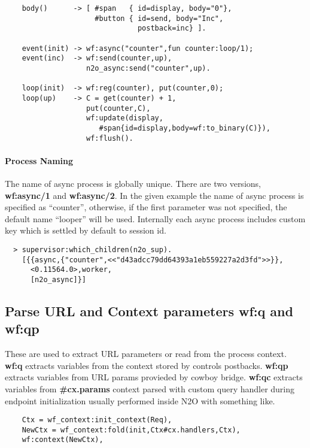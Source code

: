 \vspace{1\baselineskip}
\begin{lstlisting}
    body()      -> [ #span   { id=display, body="0"},
                     #button { id=send, body="Inc",
                               postback=inc} ].

    event(init) -> wf:async("counter",fun counter:loop/1);
    event(inc)  -> wf:send(counter,up),
                   n2o_async:send("counter",up).

    loop(init)  -> wf:reg(counter), put(counter,0);
    loop(up)    -> C = get(counter) + 1,
                   put(counter,C),
                   wf:update(display,
                      #span{id=display,body=wf:to_binary(C)}),
                   wf:flush().
\end{lstlisting}

\paragraph{\bf Process Naming}
The name of async process is globally unique. There are two
versions, {\bf wf:async/1} and {\bf wf:async/2}. In the given example
the name of async process is specified as ``counter'', otherwise,
if the first parameter was not specified, the default name ``looper''
will be used. Internally each async process includes custom key which is settled by
default to session id.

\begin{lstlisting}
  > supervisor:which_children(n2o_sup).
    [{{async,{"counter",<<"d43adcc79dd64393a1eb559227a2d3fd">>}},
      <0.11564.0>,worker,
      [n2o_async]}]
\end{lstlisting}

\subsection{Parse URL and Context parameters {\bf wf:q} and {\bf wf:qp}}
These are used to extract URL parameters or read from the process context.
{\bf wf:q} extracts variables from the context stored by controls postbacks.
{\bf wf:qp} extracts variables from URL params provieded by cowboy bridge.
{\bf wf:qc} extracts variables from {\bf \#cx.params} context parsed with
custom query handler during endpoint initialization usually performed
inside N2O with something like.

\vspace{1\baselineskip}
\begin{lstlisting}
    Ctx = wf_context:init_context(Req),
    NewCtx = wf_context:fold(init,Ctx#cx.handlers,Ctx),
    wf:context(NewCtx),
\end{lstlisting}
\vspace{1\baselineskip}

